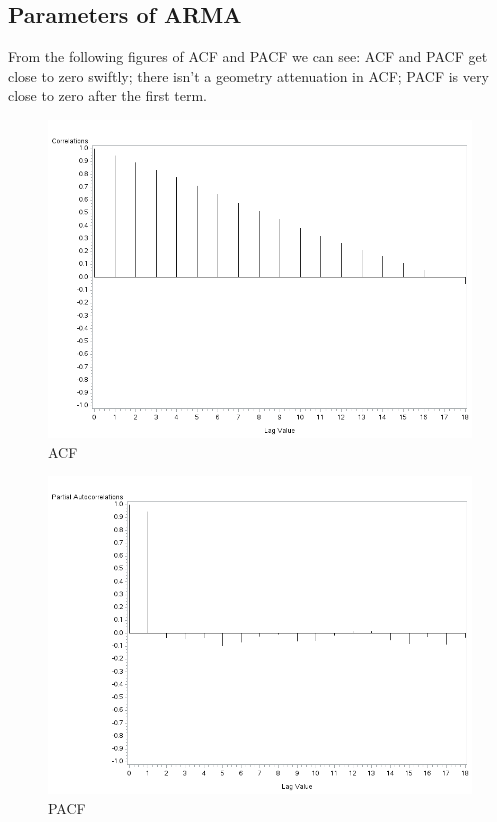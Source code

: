 \documentclass{article}
\begin{document}
\subsection{Parameters of ARMA}
From the following figures of ACF and PACF we can see: ACF and PACF get close to zero swiftly; there isn't a geometry attenuation in ACF; PACF is very close to zero after the first term.
\begin{figure}[!h]
\centering
\includegraphics[width=0.8\linewidth]{gplot1.png}
\caption{ACF}
\end{figure}
\begin{figure}[!h]
\centering
\includegraphics[width=0.8\linewidth]{gplot2.png}
\caption{PACF}
\end{figure}

\newpage
\end{document}
